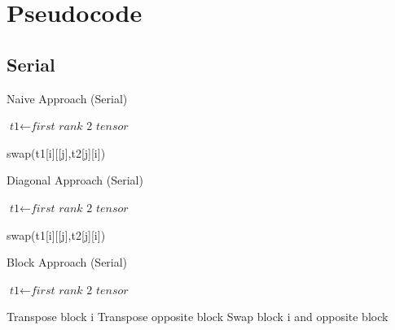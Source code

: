 \documentclass[journal,10pt]{IEEEtran}
\begin{document}

\printbibliography

\clearpage

\onecolumn
\section*{Pseudocode}
\subsection*{Serial}

\begin{algorithm}
\caption{Naive Approach (Serial)}\label{euclid}
\begin{algorithmic}[1]
\State $\textit{t1} \gets \textit{first rank 2 tensor}$


\State swap(t1[i][[j],t2[j][i])
\EndFor
\EndFor



\EndProcedure
\end{algorithmic}
\end{algorithm}


\begin{algorithm}
\caption{Diagonal Approach (Serial)}\label{euclid}
\begin{algorithmic}[1]
\State $\textit{t1} \gets \textit{first rank 2 tensor}$


\State swap(t1[i][[j],t2[j][i])
\EndFor
\EndFor



\EndProcedure
\end{algorithmic}
\end{algorithm}


\begin{algorithm}
\caption{Block Approach (Serial)}\label{euclid}
\begin{algorithmic}[1]
\State $\textit{t1} \gets \textit{first rank 2 tensor}$


\State Transpose block i
\State Transpose opposite block
\State Swap block i and opposite block
\EndFor



\EndProcedure
\end{algorithmic}
\end{algorithm}
\end{document}
